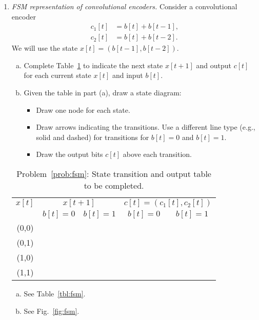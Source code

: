 \documentclass[11pt]{article}
\begin{document}
\begin{enumerate}
\item \label{prob:fsm}  
\emph{FSM representation of convolutional encoders.}
Consider a convolutional encoder
\begin{align*}
    c_1[t] &= b[t] + b[t-1], \\
    c_2[t] &= b[t] + b[t-2].
\end{align*}
We will use the state $x[t] = (b[t-1],b[t-2])$.
\begin{enumerate}[(a)]
\item Complete Table~\ref{tbl:fsmempty} to indicate the next
state $x[t+1]$ and output $c[t]$ for each current state $x[t]$
and input $b[t]$.

\item Given the table in part (a), draw a state diagram:
\begin{itemize}
\item Draw one node for each state. 
\item Draw arrows indicating the transitions.  Use a different
line type (e.g., solid and dashed) for transitions for $b[t]=0$
and $b[t]=1$.
\item Draw the output bits $c[t]$ above each transition.
\end{itemize}
\end{enumerate}


\begin{table}
\begin{center}
\begin{tabular}{|c|c|c|c|c|}
\hline
$x[t]$ & \multicolumn{2}{|c|}{$x[t+1]$}
& \multicolumn{2}{|c|}{$c[t]=(c_1[t],c_2[t])$} \\ \cline{2-5}
 & $b[t]=0$ & $b[t]=1$ & $b[t]=0$ & $b[t]=1$ \\ \hline
(0,0) & & & &  \\ \hline
(0,1) & & & &  \\ \hline
(1,0) & & & &  \\ \hline
(1,1) & & & &  \\ \hline
\end{tabular}
\end{center}
\caption{Problem~\ref{prob:fsm}:  State transition
and output table to be completed.}
\label{tbl:fsmempty}
\end{table}

\begin{solution}
\begin{enumerate}[(a)]
\item See Table~\ref{tbl:fsm}.
\item See Fig.~\ref{fig:fsm}.
\end{enumerate}
\end{solution}


\end{enumerate}
\end{document}
